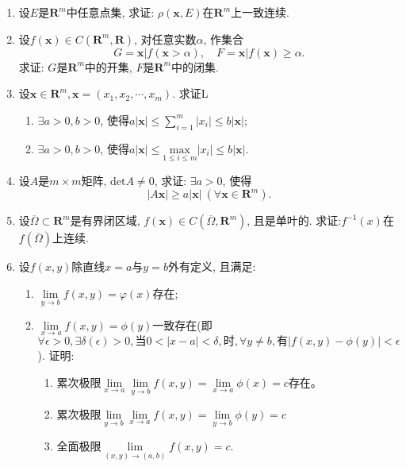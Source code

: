 \begin{enumerate}
\item 设$E$是$\bm{R}^m$中任意点集, 求证: $\rho(\bm{x},E)$在$\bm{R}^m$上一致连续.
\item 设$f(\bm{x})\in C(\bm{R}^m,\bm{R})$, 对任意实数$\alpha$, 作集合
$$ G={\bm{x}|f(\bm{x}>\alpha)},\quad F={\bm{x}|f(\bm{x})\ge\alpha}.$$
求证: $G$是$\bm{R}^m$中的开集, $F$是$\bm{R}^m$中的闭集.
\item 设$\bm{x}\in \bm{R}^m, \bm{x}=(x_1,x_2,\cdots,x_m)$. 求证L
\begin{enumerate}
	\item $\exists a>0, b>0$, 使得$a|\bm{x}|\le \sum\limits_{i=1}^{m}|x_i|\le b|\bm{x}|$;
		\item $\exists a>0, b>0$, 使得$a|\bm{x}|\le \underset{1\le i \le m}{\mathrm{max}}|x_i|\le b|\bm{x}|$.
\end{enumerate}
\item 设$A$是$m\times m$矩阵, $\mathrm{det}A\ne 0$, 求证: $\exists a>0$, 使得
$$ |A\bm{x}|\ge a|\bm{x}|\ (\forall \bm{x}\in \bm{R}^m).$$
\item 设$\overline{\Omega}\subset\bm{R}^m$是有界闭区域, $f(\bm{x})\in C(\overline{\Omega},\bm{R}^m)$, 且是单叶的. 求证:$f^{-1}(x)$在$f(\overline{\Omega})$上连续.
\item 设$f(x,y)$除直线$x=a$与$y=b$外有定义, 且满足:
\begin{enumerate}
	\item $\lim\limits_{y\rightarrow b}f(x,y)=\varphi (x)$存在;
	\item $\lim\limits_{x\rightarrow a}f(x,y)=\phi (y)$一致存在(即$\forall \epsilon >0,\exists \delta (\epsilon)>0,\text{当}0<|x-a|<\delta, \text{时}, \forall y\ne b,\text{有}|f(x,y)-\phi(y)|<\epsilon$).
	证明:
	\begin{enumerate}
		\item 累次极限$\lim\limits_{x\rightarrow a}\lim\limits_{y\rightarrow b}f(x,y)=\lim\limits_{x\rightarrow a}\phi(x)=c$存在。
		\item 累次极限$\lim\limits_{y\rightarrow b}\lim\limits_{x\rightarrow a}f(x,y)=\lim\limits_{y\rightarrow b}\phi(y)=c$
		\item 全面极限$\lim\limits_{(x,y)\rightarrow (a,b)}f(x,y)=c$.
	\end{enumerate}
	
\end{enumerate}
\end{enumerate}

